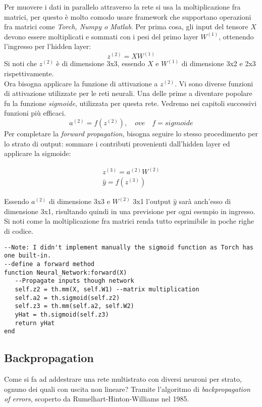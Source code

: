 Per muovere i dati in parallelo attraverso la rete si usa la moltiplicazione fra matrici, per questo è molto comodo usare framework che supportano operazioni fra matrici come \emph{Torch, Numpy o Matlab}. Per prima cosa, gli input del tensore $X$ devono essere moltiplicati e sommati con i pesi del primo layer $W^{(1)}$, ottenendo l'ingresso per l'hidden layer: 
\begin{equation}
z^{(2)} = XW^{(1)} \tag{1}
\end{equation}
Si noti che $z^{(2)}$ è di dimensione 3x3, essendo $X$ e $W^{(1)}$ di dimensione 3x2 e 2x3 rispettivamente. \\
Ora bisogna applicare la funzione di attivazione a $z^{(2)}$. Vi sono diverse funzioni di attivazione utilizzate per le reti neurali. Una delle prime a diventare popolare fu la funzione \emph{sigmoide}\parencite{WSigmoid}, utilizzata per questa rete. Vedremo nei capitoli successivi funzioni più efficaci.
\begin{equation}
a^{(2)} = f(z^{(2)}) \tag{2},\quad ove \quad f=sigmoide
\end{equation}
Per completare la \emph{forward propagation}, bisogna seguire lo stesso procedimento per lo strato di output: sommare i contributi provenienti dall'hidden layer ed applicare la sigmoide: 
\begin{center}
\begin{align*}
z^{(3)} = a^{(2)}W^{(2)} \tag{3}\\
\hat{y} = f(z^{(3)}) \tag{4}
\end{align*}
\end{center}
Essendo $a^{(2)}$ di dimensione 3x3 e $W^{(2)}$ 3x1 l'output $\hat{y}$ sarà anch'esso di dimensione 3x1, risultando quindi in una previsione per ogni esempio in ingresso. \\
Si noti come la moltiplicazione fra matrici renda tutto esprimibile in poche righe di codice. 
\begin{lstlisting}[language={[5.2]Lua}]
--Note: I didn't implement manually the sigmoid function as Torch has one built-in.
--define a forward method
function Neural_Network:forward(X)
   --Propagate inputs though network
   self.z2 = th.mm(X, self.W1) --matrix multiplication
   self.a2 = th.sigmoid(self.z2)
   self.z3 = th.mm(self.a2, self.W2)
   yHat = th.sigmoid(self.z3)
   return yHat
end
\end{lstlisting}
\subsection{Backpropagation}
Come si fa ad addestrare una rete multistrato con diversi neuroni per strato, ognuno dei quali con uscita non lineare? Tramite l'algoritmo di \emph{backpropagation of errors}, scoperto da Rumelhart-Hinton-Williams nel 1985. 

